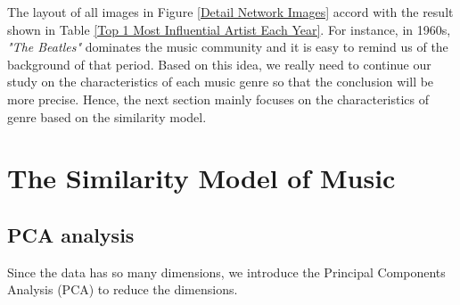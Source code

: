 \documentclass[12pt]{article}
\begin{document}
The layout of all images in Figure \ref{Detail Network Images} accord with the result shown in Table \ref{Top 1 Most Influential Artist Each Year}. For instance, in 1960s, \emph{"The Beatles"} dominates the music community and it is easy to remind us of the background of that period. Based on this idea, we really need to continue our study on the characteristics of each music genre so that the conclusion will be more precise. Hence, the next section mainly focuses on the characteristics of genre based on the similarity model.

\section{The Similarity Model of Music}
\subsection{PCA analysis}
Since the data has so many dimensions, we introduce the Principal Components Analysis (PCA) to reduce the dimensions.
\end{document}
